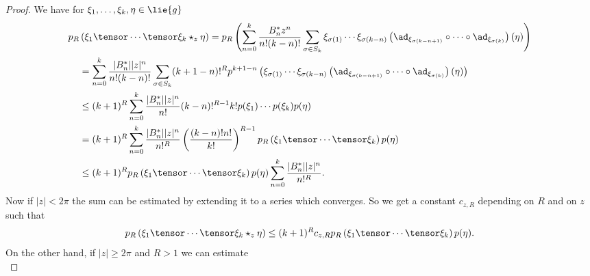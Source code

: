 \begin{proof}
    We have for $\xi_1, \ldots, \xi_k, \eta \in \lie{g}$
    \begin{align*}
        p_R 
        &
        \left(
            \xi_1 \tensor
             \cdots \tensor \xi_k \ostar_z \eta
        \right)
        =
        p_R \left(
            \sum\limits_{n=0}^k
            \frac{B_n^* z^n}{n! (k-n)!}
            \sum\limits_{\sigma \in S_k}
            \xi_{\sigma(1)} \cdots \xi_{\sigma(k - n)}
            \left(
                \ad_{\xi_{\sigma(k - n + 1)}}
                \circ \cdots \circ
                \ad_{\xi_{\sigma(k)}}
            \right)
            (\eta)
        \right)
        \\
        & =
        \sum\limits_{n=0}^k
        \frac{|B_n^*| |z|^n}{n! (k - n)!}
        \sum\limits_{\sigma \in S_k}
        (k + 1 - n)!^R
        p^{k + 1 - n}
        \left(
            \xi_{\sigma(1)} \cdots \xi_{\sigma(k - n)}
            \left(
                \ad_{\xi_{\sigma(k - n + 1)}}
                \circ \cdots \circ
                \ad_{\xi_{\sigma(k)}}
            \right)
            (\eta)
        \right)
        \\
        & \leq
        (k + 1)^R
        \sum\limits_{n=0}^k
        \frac{|B_n^*| |z|^n}{n!}
        (k - n)!^{R - 1}
        k! p(\xi_1) \cdots p(\xi_k) p(\eta)
        \\
        & =
        (k + 1)^R
        \sum\limits_{n=0}^k
        \frac{|B_n^*| |z|^n}{n!^R}
        \left( \frac{(k - n)! n!}{k!} \right)^{R - 1}
        p_R \left(
         	\xi_1 \tensor \cdots \tensor \xi_k
        \right)
        p(\eta)
        \\
        & \leq
        (k + 1)^R
		p_R \left(
         	\xi_1 \tensor \cdots \tensor \xi_k
        \right)
        p(\eta)
        \sum\limits_{n=0}^k
        \frac{|B_n^*| |z|^n}{n!^R}.
    \end{align*}
    Now if $|z| < 2 \pi$ the sum can be estimated by extending it to a
    series which converges. So we get a constant $c_{z, R}$ depending
    on $R$ and on $z$ such that
    \begin{equation*}
        p_R \left(
            \xi_1
            \tensor \cdots \tensor \xi_k
            \ostar_z
            \eta
        \right)
        \leq
        (k + 1)^R c_{z, R}
		p_R \left(
         	\xi_1 \tensor \cdots \tensor \xi_k
        \right)
        p(\eta).
    \end{equation*}
    On the other hand, if $|z| \geq 2 \pi$ and $R > 1$ we can estimate
    \begin{equation*}

\end{equation*}
\end{proof}
